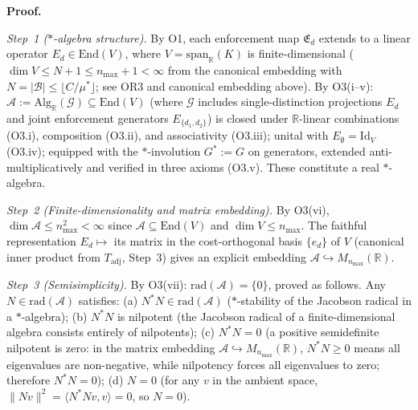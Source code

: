 \documentclass[11pt]{article}
\theoremstyle{remark}
\begin{document}
\begin{tcolorbox}[apfbox, title={T2a: Real $*$-Algebra from Enforcement Operations}]
\smallskip\noindent\textbf{Proof.}

\textit{Step~1 ($*$-algebra structure).}  By O1, each enforcement map $\mathfrak{E}_d$ extends to a linear operator $E_d \in \mathrm{End}(V)$, where $V = \mathrm{span}_\mathbb{R}(K)$ is finite-dimensional ($\dim V \leq N+1 \leq n_{\max}+1 < \infty$ from the canonical embedding with $N = |\mathcal{B}| \leq \lfloor C/\mu^* \rfloor$; see OR3 and canonical embedding above).  By O3(i--v): $\mathcal{A} := \mathrm{Alg}_\mathbb{R}(\mathcal{G}) \subseteq \mathrm{End}(V)$ (where $\mathcal{G}$ includes single-distinction projections $E_d$ and joint enforcement generators $E_{\{d_1,d_2\}}$) is closed under $\mathbb{R}$-linear combinations (O3.i), composition (O3.ii), and associativity (O3.iii); unital with $E_\emptyset = \mathrm{Id}_V$ (O3.iv); equipped with the $*$-involution $G^* := G$ on generators, extended anti-multiplicatively and verified in three axioms (O3.v).  These constitute a real $*$-algebra.

\textit{Step~2 (Finite-dimensionality and matrix embedding).}  By O3(vi), $\dim\mathcal{A} \le n_{\max}^2 < \infty$ since $\mathcal{A} \subseteq \mathrm{End}(V)$ and $\dim V \le n_{\max}$.  The faithful representation $E_d \mapsto$ its matrix in the cost-orthogonal basis $\{e_d\}$ of $V$ (canonical inner product from $T_{\mathrm{adj}}$, Step~3) gives an explicit embedding $\mathcal{A} \hookrightarrow M_{n_{\max}}(\mathbb{R})$.

\textit{Step~3 (Semisimplicity).}  By O3(vii): $\mathrm{rad}(\mathcal{A}) = \{0\}$, proved as follows.  Any $N \in \mathrm{rad}(\mathcal{A})$ satisfies: (a) $N^*N \in \mathrm{rad}(\mathcal{A})$ ($*$-stability of the Jacobson radical in a $*$-algebra); (b) $N^*N$ is nilpotent (the Jacobson radical of a finite-dimensional algebra consists entirely of nilpotents); (c) $N^*N = 0$ (a positive semidefinite nilpotent is zero: in the matrix embedding $\mathcal{A} \hookrightarrow M_{n_{\max}}(\mathbb{R})$, $N^*N \ge 0$ means all eigenvalues are non-negative, while nilpotency forces all eigenvalues to zero; therefore $N^*N = 0$); (d) $N = 0$ (for any $v$ in the ambient space, $\|Nv\|^2 = \langle N^*Nv, v\rangle = 0$, so $N = 0$).


\end{tcolorbox}
\end{document}
